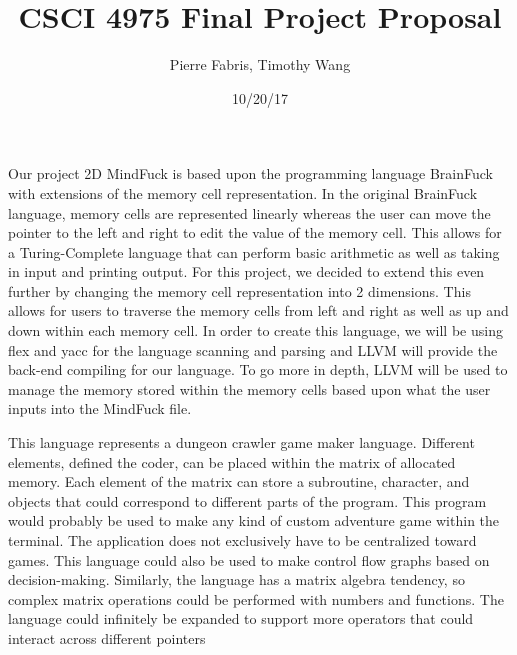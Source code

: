 \documentclass[]{article}
\title{\textbf{CSCI 4975 Final Project Proposal}}
\author{Pierre Fabris, Timothy Wang}
\date{10/20/17}
\begin{document}
    \maketitle
Our project 2D MindFuck is based upon the programming language BrainFuck with extensions of the memory
cell representation. In the original BrainFuck language, memory cells are represented linearly whereas 
the user can move the pointer to the left and right to edit the value of the memory cell. This allows 
for a Turing-Complete language that can perform basic arithmetic as well as taking in input and printing
output. For this project, we decided to extend this even further by changing the memory cell representation
into 2 dimensions. This allows for users to traverse the memory cells from left and right as well as up and
down within each memory cell. In order to create this language, we will be using flex and yacc for the 
language scanning and parsing and LLVM will provide the back-end compiling for our language. To go more in depth,
LLVM will be used to manage the memory stored within the memory cells based upon what the user inputs into the 
MindFuck file. 


This language represents a dungeon crawler game maker language.
Different elements, defined the coder, can be placed within the matrix of allocated memory.
Each element of the matrix can store a subroutine, character, and objects that could correspond to different parts of the program.
This program would probably be used to make any kind of custom adventure game within the terminal.
The application does not exclusively have to be centralized toward games.
This language could also be used to make control flow graphs based on decision-making.
Similarly, the language has a matrix algebra tendency, so complex matrix operations could be performed with numbers and functions.
The language could infinitely be expanded to support more operators that could interact across different pointers
\end{document}
